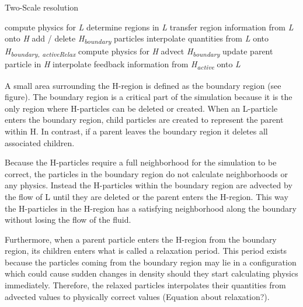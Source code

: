 \documentclass[../../main.tex]{subfiles}
\begin{document}
\begin{algorithm}[h]
    \caption{Two-Scale resolution}
    \label{alg:twoscale}
    \begin{algorithmic}[1]
        \State compute physics for \textit{L}
        \State determine regions in \textit{L}
        \State transfer region information from \textit{L} onto \textit{H}
        \State add / delete \textit{\texorpdfstring{H\textsubscript{boundary}}{H boundary}} particles
        \State interpolate quantities from \textit{L} onto \textit{\texorpdfstring{H\textsubscript{boundary, activeRelax}}{H boundary, activeRelax}}
                \State compute physics for \textit{H}
            \State advect \textit{\texorpdfstring{H\textsubscript{boundary}}{H boundary}}
        \EndFor
        \State update parent particle in \textit{H}
        \State interpolate feedback information from \textit{{\texorpdfstring{H\textsubscript{active}}{H active}}} onto \textit{L}
        \EndWhile
   \end{algorithmic}
\end{algorithm}

A small area surrounding the H-region is defined as the boundary region (see figure). The boundary region is a critical part of the simulation because it is the only region where H-particles can be deleted or created. When an L-particle enters the boundary region, child particles are created to represent the parent within H. In contrast, if a parent leaves the boundary region it deletes all associated children. 

Because the H-particles require a full neighborhood for the simulation to be correct, the particles in the boundary region do not calculate neighborhoods or any physics. Instead the H-particles within the boundary region are advected by the flow of L until they are deleted or the parent enters the H-region. This way the H-particles in the H-region has a satisfying neighborhood along the boundary without losing the flow of the fluid. 

Furthermore, when a parent particle enters the H-region from the boundary region, its children enters what is called a relaxation period. This period exists because the particles coming from the boundary region may lie in a configuration which could cause sudden changes in density should they start calculating physics immediately. Therefore, the relaxed particles interpolates their quantities from advected values to physically correct values (Equation about relaxation?). 
\end{document}
